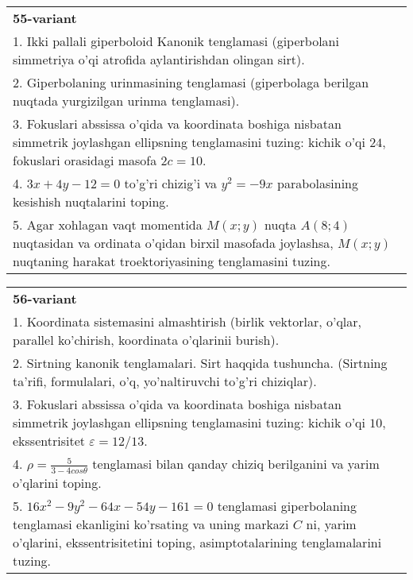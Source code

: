\documentclass{article}
\begin{document}
\begin{tabular}{m{17cm}}
\textbf{55-variant}\\
1. Ikki pallali giperboloid Kanonik tenglamasi (giperbolani simmetriya o'qi atrofida aylantirishdan olingan sirt).\\

2. Giperbolaning urinmasining tenglamasi (giperbolaga berilgan nuqtada yurgizilgan urinma tenglamasi).\\

3. Fokuslari abssissa o'qida va koordinata boshiga nisbatan simmetrik joylashgan ellipsning tenglamasini tuzing: kichik o'qi $24$, fokuslari orasidagi masofa $2c=10$.\\

4. $3x + 4y - 12 = 0$ to'g'ri chizig'i va $y^{2} = - 9x$ parabolasining kesishish nuqtalarini toping.\\

5. Agar xohlagan vaqt momentida $M(x;y)$ nuqta $A(8;4)$ nuqtasidan va ordinata o'qidan birxil masofada joylashsa, $M(x;y)$ nuqtaning harakat troektoriyasining tenglamasini tuzing.  
\end{tabular}
\vspace{1cm}


\begin{tabular}{m{17cm}}
\textbf{56-variant}\\
1. Koordinata sistemasini almashtirish (birlik vektorlar, o'qlar, parallel ko'chirish, koordinata o'qlarinii burish).\\

2. Sirtning kanonik tenglamalari. Sirt haqqida tushuncha. (Sirtning ta'rifi, formulalari, o'q, yo'naltiruvchi to'g'ri chiziqlar).\\

3. Fokuslari abssissa o'qida va koordinata boshiga nisbatan simmetrik joylashgan ellipsning tenglamasini tuzing: kichik o'qi $10$, ekssentrisitet $\varepsilon=12/13$.\\

4. $\rho = \frac{5}{3 - 4cos\theta}$ tenglamasi bilan qanday chiziq berilganini va yarim o'qlarini toping.  \\

5. $16x^{2} - 9y^{2} - 64x - 54y - 161 = 0$ tenglamasi giperbolaning tenglamasi ekanligini ko'rsating va uning markazi $C$ ni, yarim o'qlarini, ekssentrisitetini toping, asimptotalarining tenglamalarini tuzing.  
\end{tabular}
\vspace{1cm}
\end{document}
